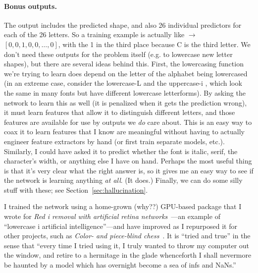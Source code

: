 \documentclass[twocolumn]{article}
\begin{document}
\paragraph{Bonus outputs.} The output includes the predicted shape,
and also 26 individual predictors for each of the 26 letters. So a
training example is actually like  $\rightarrow$
 $[0, 0, 1, 0, 0, \ldots, 0]$, with the 1 in the third
place because C is the third letter. We don't need these outputs for
the problem itself (e.g. to lowercase new letter shapes), but there
are several ideas behind this. First, the lowercasing function we're
trying to learn does depend on the letter of the alphabet being
lowercased (in an extreme case, consider the lowercase-L
 and the uppercase-i , which look the same
in many fonts but have different lowercase letterforms). By asking the
network to learn this as well (it is penalized when it gets the
prediction wrong), it must learn features that allow it to distinguish
different letters, and those features are available for use by outputs
we {\em do} care about. This is an easy way to coax it to learn
features that I know are meaningful without having to actually
engineer feature extractors by hand (or first train separate models,
etc.). Similarly, I could have asked it to predict whether the font
is italic, serif, the character's width, or anything else I have on
hand. Perhaps the most useful thing is that it's very clear what the
right answer is, so it gives me an easy way to see if the network is
learning anything {\em at all}. (It does.) Finally, we can do some
silly stuff with these; see Section~\ref{sec:hallucination}.

\newcommand\nan{\textsf{NaN}}
\renewcommand\inf{\textsf{inf}}

I trained the network using a home-grown (why??) GPU-based package
that I wrote for {\em Red i removal with artificial retina
  networks}~\cite{murphy2015redi}---an example of ``lowercase i
artificial intelligence''---and have improved as I repurposed it for
other projects, such as {\em Color- and piece-blind
  chess}~\cite{murphy2019blind}. It is ``tried and true'' in the
sense that ``every time I tried using it, I truly wanted to throw
my computer out the window, and retire to a hermitage in the glade
whenceforth I shall nevermore be haunted by a model which has
overnight become a sea of \inf{}s and \nan{}s.''
\end{document}
